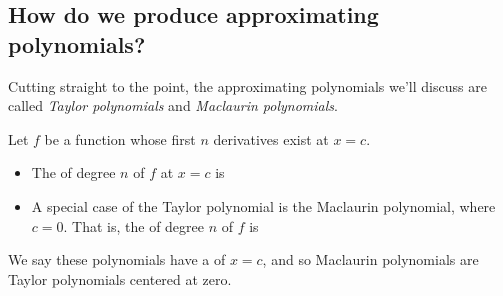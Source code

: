 \documentclass{ximera}
\begin{document}
\subsection{How do we produce approximating polynomials?}

Cutting straight to the point, the approximating polynomials we'll
discuss are called \textit{Taylor polynomials} and \textit{Maclaurin
  polynomials}.

\begin{definition}
  Let $f$ be a function whose first $n$ derivatives exist at $x=c$.
  \begin{itemize}
  \item The  of degree $n$ of $f$ at $x=c$ is
    \begin{image}
    \end{image}
  \item A special case of the Taylor polynomial is the Maclaurin
    polynomial, where $c=0$. That is, the 
    of degree $n$ of $f$ is
    \begin{image}
    \end{image}
  \end{itemize}
  We say these polynomials have a  of $x=c$, and so
  Maclaurin polynomials are Taylor polynomials centered at
  zero.
\end{definition}
\end{document}
